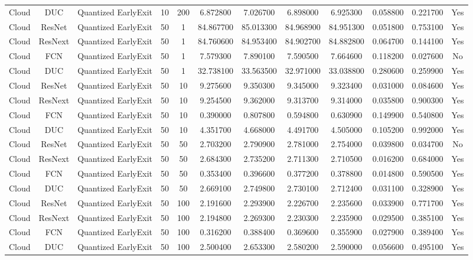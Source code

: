 \begin{tabular}{|c||c||c||c||c||c||c||c||c||c||c||c|}
Cloud & DUC & Quantized EarlyExit & 10 & 200 & 6.872800 & 7.026700 & 6.898000 & 6.925300 & 0.058800 & 0.221700 & Yes \\
Cloud & ResNet & Quantized EarlyExit & 50 & 1 & 84.867700 & 85.013300 & 84.968900 & 84.951300 & 0.051800 & 0.753100 & Yes \\
Cloud & ResNext & Quantized EarlyExit & 50 & 1 & 84.760600 & 84.953400 & 84.902700 & 84.882800 & 0.064700 & 0.144100 & Yes \\
Cloud & FCN & Quantized EarlyExit & 50 & 1 & 7.579300 & 7.890100 & 7.590500 & 7.664600 & 0.118200 & 0.027600 & No \\
Cloud & DUC & Quantized EarlyExit & 50 & 1 & 32.738100 & 33.563500 & 32.971000 & 33.038800 & 0.280600 & 0.259900 & Yes \\
Cloud & ResNet & Quantized EarlyExit & 50 & 10 & 9.275600 & 9.350300 & 9.345000 & 9.323400 & 0.031000 & 0.084600 & Yes \\
Cloud & ResNext & Quantized EarlyExit & 50 & 10 & 9.254500 & 9.362000 & 9.313700 & 9.314000 & 0.035800 & 0.900300 & Yes \\
Cloud & FCN & Quantized EarlyExit & 50 & 10 & 0.390000 & 0.807800 & 0.594800 & 0.630900 & 0.149900 & 0.540800 & Yes \\
Cloud & DUC & Quantized EarlyExit & 50 & 10 & 4.351700 & 4.668000 & 4.491700 & 4.505000 & 0.105200 & 0.992000 & Yes \\
Cloud & ResNet & Quantized EarlyExit & 50 & 50 & 2.703200 & 2.790900 & 2.781000 & 2.754000 & 0.039800 & 0.034700 & No \\
Cloud & ResNext & Quantized EarlyExit & 50 & 50 & 2.684300 & 2.735200 & 2.711300 & 2.710500 & 0.016200 & 0.684000 & Yes \\
Cloud & FCN & Quantized EarlyExit & 50 & 50 & 0.353400 & 0.396600 & 0.377200 & 0.378800 & 0.014800 & 0.590500 & Yes \\
Cloud & DUC & Quantized EarlyExit & 50 & 50 & 2.669100 & 2.749800 & 2.730100 & 2.712400 & 0.031100 & 0.328900 & Yes \\
Cloud & ResNet & Quantized EarlyExit & 50 & 100 & 2.191600 & 2.293900 & 2.226700 & 2.235600 & 0.033900 & 0.771700 & Yes \\
Cloud & ResNext & Quantized EarlyExit & 50 & 100 & 2.194800 & 2.269300 & 2.230300 & 2.235900 & 0.029500 & 0.385100 & Yes \\
Cloud & FCN & Quantized EarlyExit & 50 & 100 & 0.316200 & 0.388400 & 0.369600 & 0.355900 & 0.027900 & 0.389400 & Yes \\
Cloud & DUC & Quantized EarlyExit & 50 & 100 & 2.500400 & 2.653300 & 2.580200 & 2.590000 & 0.056600 & 0.495100 & Yes \\

\end{tabular}
